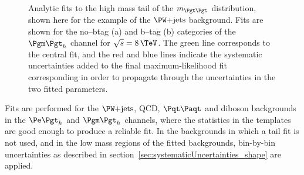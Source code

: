\begin{figure}[tbh]
\caption[Analytic fits to the high mass tail of the $m_{\Pgt\Pgt}$ distribution,
shown for the example of the $\WJets$ background.]{Analytic fits to the high mass tail of the $m_{\Pgt\Pgt}$ distribution,
shown here for the example of the $\WJets$ background. Fits are shown for the
no--btag (a) and b--tag (b) categories of the $\mutau$ channel for
$\sqrt{s}=8\,\TeV$. The green line corresponds to the central fit, and the red and blue
lines indicate the systematic uncertainties added to the final
maximum-likelihood fit corresponding in order to propagate through the
uncertainties in the two fitted parameters.}
\label{fig:tailfits}
\end{figure}

Fits are performed for the $\WJets$, QCD, $\ttbar$ and diboson backgrounds in the $\etau$
and $\mutau$ channels, where the statistics in the templates are good enough to
produce a reliable fit. In the backgrounds in which a tail fit is not used, and
in the low mass regions of the fitted backgrounds, bin-by-bin uncertainties as
described in section~\ref{sec:systematicUncertainties_shape} are applied.

